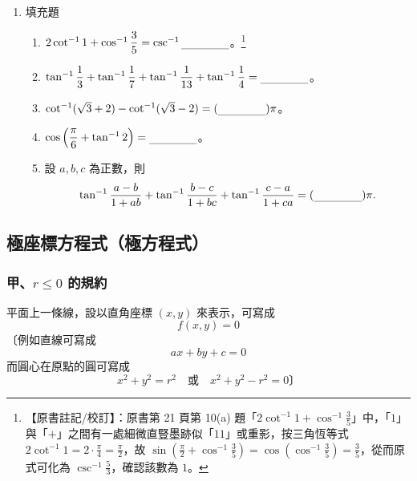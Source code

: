\begin{enumerate}[label=\arabic*., topsep=4pt, itemsep=6pt]
  \item 填充題
  \begin{enumerate}[label=(\alph*), topsep=2pt, itemsep=6pt]
    \item $2 \cot^{-1} 1 + \cos^{-1} \dfrac{3}{5} = \csc^{-1} \blank$。\label{note:b5s-ch1-p21ex10a}\footnote{【原書註記/校訂】：原書第 21 頁第 10(a) 題「$2\cot^{-1} 1 + \cos^{-1} \frac{3}{5}$」中，「$1$」與「$+$」之間有一處細微直豎墨跡似「$11$」或重影，按三角恆等式 $2\cot^{-1} 1 = 2 \cdot \frac{\pi}{4} = \frac{\pi}{2}$，故 $\sin\left(\frac{\pi}{2} + \cos^{-1}\frac{3}{5}\right) = \cos\left(\cos^{-1}\frac{3}{5}\right) = \frac{3}{5}$，從而原式可化為 $\csc^{-1}\frac{5}{3}$，確認該數為 $1$。}
    \item $\tan^{-1} \dfrac{1}{3} + \tan^{-1} \dfrac{1}{7} + \tan^{-1} \dfrac{1}{13} + \tan^{-1} \dfrac{1}{4} = \blank$。
    \item $\cot^{-1}(\sqrt{3} + 2) - \cot^{-1}(\sqrt{3} - 2) = (\blank)\pi$。
    \item $\cos\left(\dfrac{\pi}{6} + \tan^{-1} 2\right) = \blank$。
    \item 設 $a, b, c$ 為正數，則
    \[
    \tan^{-1} \frac{a - b}{1 + ab} + \tan^{-1} \frac{b - c}{1 + bc} + \tan^{-1} \frac{c - a}{1 + ca} = (\blank)\pi.
    \]
  \end{enumerate}
\end{enumerate}


\subsection{極座標方程式（極方程式）}\label{sec:b5s-1-3}

\subsubsection*{甲、$r \le 0$ 的規約}\label{subsec:b5s-1-3-a}

平面上一條線，設以直角座標 $(x, y)$ 來表示，可寫成
\begin{equation}\label{eq:b5s-1-3-1}
  f(x, y) = 0 \tag{1}
\end{equation}
〔例如\quad 直線可寫成
\[
  ax + by + c = 0
\]
而圓心在原點的圓可寫成
\[
  x^2 + y^2 = r^2 \quad \text{或} \quad x^2 + y^2 - r^2 = 0 \text{〕}
\]

